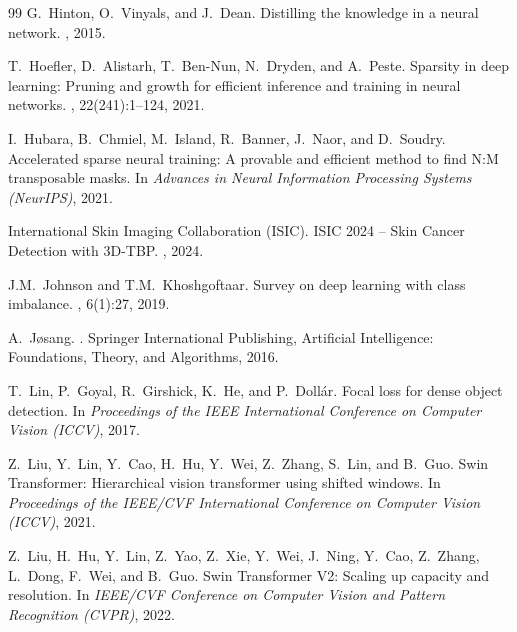 \documentclass[11pt, a4paper]{article}
\begin{document}
\begin{thebibliography}{99}
G.~Hinton, O.~Vinyals, and J.~Dean.
\newblock Distilling the knowledge in a neural network.
, 2015.

T.~Hoefler, D.~Alistarh, T.~Ben-Nun, N.~Dryden, and A.~Peste.
\newblock Sparsity in deep learning: Pruning and growth for efficient inference and training in neural networks.
, 22(241):1--124, 2021.


I.~Hubara, B.~Chmiel, M.~Island, R.~Banner, J.~Naor, and D.~Soudry.
\newblock Accelerated sparse neural training: A provable and efficient method to find N:M transposable masks.
\newblock In {\em Advances in Neural Information Processing Systems (NeurIPS)}, 2021.


International Skin Imaging Collaboration (ISIC).
\newblock ISIC 2024 -- Skin Cancer Detection with 3D-TBP.
, 2024.

J.M.~Johnson and T.M.~Khoshgoftaar.
\newblock Survey on deep learning with class imbalance.
, 6(1):27, 2019.

A.~J{\o}sang.
.
\newblock Springer International Publishing, Artificial Intelligence: Foundations, Theory, and Algorithms, 2016.

T.~Lin, P.~Goyal, R.~Girshick, K.~He, and P.~Doll{\'a}r.
\newblock Focal loss for dense object detection.
\newblock In {\em Proceedings of the IEEE International Conference on Computer Vision (ICCV)}, 2017.

Z.~Liu, Y.~Lin, Y.~Cao, H.~Hu, Y.~Wei, Z.~Zhang, S.~Lin, and B.~Guo.
\newblock Swin Transformer: Hierarchical vision transformer using shifted windows.
\newblock In {\em Proceedings of the IEEE/CVF International Conference on Computer Vision (ICCV)}, 2021.

Z.~Liu, H.~Hu, Y.~Lin, Z.~Yao, Z.~Xie, Y.~Wei, J.~Ning, Y.~Cao, Z.~Zhang, L.~Dong, F.~Wei, and B.~Guo.
\newblock Swin Transformer V2: Scaling up capacity and resolution.
\newblock In {\em IEEE/CVF Conference on Computer Vision and Pattern Recognition (CVPR)}, 2022.


\end{thebibliography}
\end{document}

